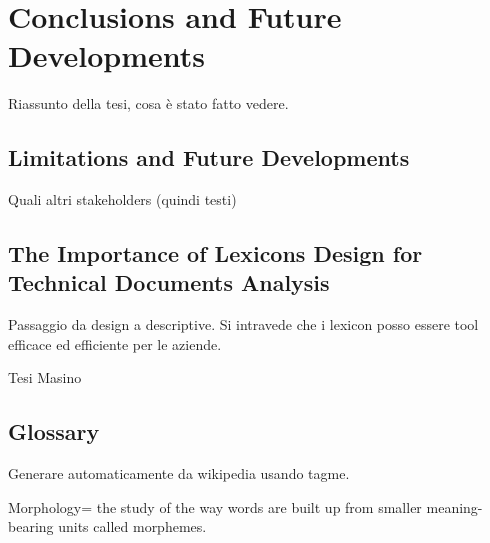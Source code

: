 \documentclass[]{book}
\begin{document}
\part{Conclusions and Future
Developments}\label{part-conclusions-and-future-developments}

Riassunto della tesi, cosa è stato fatto vedere.

\chapter{Limitations and Future
Developments}\label{limitations-and-future-developments}

Quali altri stakeholders (quindi testi)

\chapter{The Importance of Lexicons Design for Technical Documents
Analysis}\label{sotadocumentsunderstandlexicons}

Passaggio da design a descriptive. Si intravede che i lexicon posso
essere tool efficace ed efficiente per le aziende.

Tesi Masino

\chapter*{Glossary}\label{glossary}

Generare automaticamente da wikipedia usando tagme.

Morphology= the study of the way words are built up from smaller
meaning-bearing units called morphemes.


\end{document}
